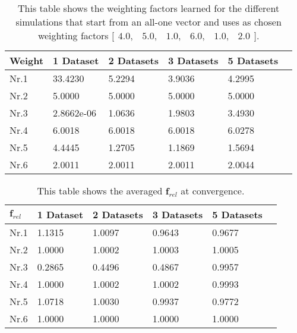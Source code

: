 \begin{table}[h!]
	\centering
	\begin{tabular}{@{}llllll} \toprule
		\textbf{Weight}   & 1 Dataset    & 2 Datasets     & 3 Datasets & 5 Datasets\\ \midrule
		Nr.1       		  &33.4230       & 5.2294       & 3.9036 & 4.2995 		\\
		Nr.2              & 5.0000         & 5.0000          & 5.0000 &5.0000      \\
		Nr.3              & 2.8662e-06     & 1.0636      & 1.9803   &3.4930   \\
		Nr.4              & 6.0018           & 6.0018            &   6.0018&6.0278     \\
		Nr.5              & 4.4445     & 1.2705      & 1.1869 &1.5694      \\
		Nr.6              & 2.0011        & 2.0011         & 2.0011 & 2.0044     \\ \bottomrule
	\end{tabular}
	\caption{This table shows the weighting factors learned for the different simulations that start from an all-one vector and uses as chosen weighting factors $\bigl[ \begin{smallmatrix} 4.0,&5.0,&1.0,&6.0,&1.0,&2.0\end{smallmatrix}\bigr]$.}
	\label{tab:complex_learning_weights}
\end{table}

\begin{table}[h!]
	\centering
	\begin{tabular}{@{}llllll} \toprule
		$\bm{f}_{rel}$   & 1 Dataset    & 2 Datasets & 3 Datasets&5 Datasets\\ \midrule
		Nr.1       		  &1.1315        & 1.0097       & 0.9643&0.9677		\\
		Nr.2              & 1.0000         & 1.0002     & 1.0003&1.0005        \\
		Nr.3              & 0.2865     & 0.4496     	& 0.4867  &0.9957     \\
		Nr.4              & 1.0000           & 1.0002   &   1.0002 &0.9993     \\
		Nr.5              & 1.0718     & 1.0030         & 0.9937 &0.9772       \\
		Nr.6              & 1.0000        & 1.0000      & 1.0000 &1.0000    \\ \bottomrule
	\end{tabular}
	\caption{This table shows the averaged $\bm{f}_{rel}$ at convergence.}
	\label{tab:complex_frel}
\end{table}

